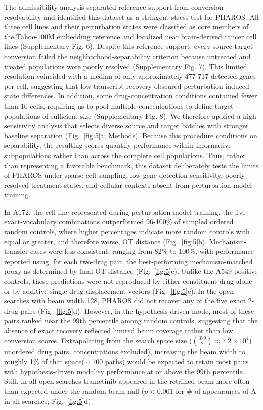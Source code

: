 \documentclass[11pt,a4paper]{article}
\begin{document}
The admissibility analysis separated reference support from conversion resolvability and identified this dataset as a stringent stress test for PHAROS. All three cell lines and their perturbation states were classified as core members of the Tahoe-100M embedding reference and localized near brain-derived cancer cell lines (Supplementary Fig. 6). Despite this reference support, every source-target conversion failed the neighborhood-separability criterion because untreated and treated populations were poorly resolved (Supplementary Fig. 7). This limited resolution coincided with a median of only approximately 477-717 detected genes per cell, suggesting that low transcript recovery obscured perturbation-induced state differences. In addition, some drug-concentration conditions contained fewer than 10 cells, requiring us to pool multiple concentrations to define target populations of sufficient size (Supplementary Fig. 8). We therefore applied a high-sensitivity analysis that selects diverse source and target batches with stronger baseline separation (Fig.~\ref{fig:5}a; Methods). Because this procedure conditions on separability, the resulting scores quantify performance within informative subpopulations rather than across the complete cell populations. Thus, rather than representing a favorable benchmark, this dataset deliberately tests the limits of PHAROS under sparse cell sampling, low gene-detection sensitivity, poorly resolved treatment states, and cellular contexts absent from perturbation-model training.

In A172, the cell line represented during perturbation-model training, the five exact-vocabulary combinations outperformed 96-100\% of sampled ordered random controls, where higher percentages indicate more random controls with equal or greater, and therefore worse, OT distance (Fig.~\ref{fig:5}b). Mechanism-transfer cases were less consistent, ranging from 82\% to 100\%, with performance reported using, for each two-drug pair, the best-performing mechanism-matched proxy as determined by final OT distance (Fig.~\ref{fig:5}e). Unlike the A549 positive controls, these predictions were not reproduced by either constituent drug alone or by additive single-drug displacement vectors (Fig.~\ref{fig:5}c). In the open searches with beam width 128, PHAROS did not recover any of the five exact 2-drug pairs (Fig.~\ref{fig:5}d). However, in the hypothesis-driven mode, most of these pairs ranked near the 99th percentile among random controls, suggesting that the absence of exact recovery reflected limited beam coverage rather than low conversion scores. Extrapolating from the search space size ($\binom{379}{2} \approx 7.2\times 10^{4}$) unordered drug pairs, concentrations excluded), increasing the beam width to roughly 1\% of that space($\sim$ 700 paths) would be expected to retain most pairs with hypothesis-driven modality performance at or above the 99th percentile. Still, in all open searches trametinib appeared in the retained beam more often than expected under the random-beam null ($p<0.001$ for \# of appearances of A in all searches; Fig.~\ref{fig:5}d).
\end{document}
